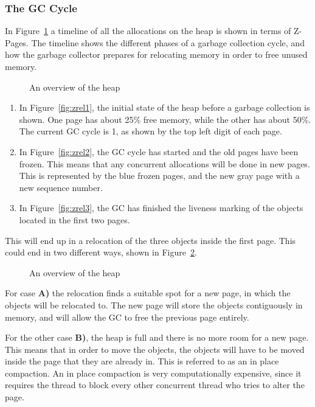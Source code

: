 \begin{figure*}
    \centering
    
    \caption[]
    {An example of a Z-Page and the overhead data that is used by ZGC.} 
    \label{fig:zpages}
\end{figure*}

\subsubsection{The GC Cycle}
In Figure~\ref{fig:zgc_timeline} a timeline of all the allocations on the heap is shown in terms of Z-Pages. The timeline shows the different phases of a garbage collection cycle, and how the garbage collector prepares for relocating memory in order to free unused memory.

\begin{figure}[!h]
    \centering
    
    \caption{An overview of the heap}
    \label{fig:zgc_timeline}
\end{figure}

\begin{enumerate}
    \item In Figure~\ref*{fig:zrel1}, the initial state of the heap before a garbage collection is shown. One page has about 25\% free memory, while the other has about 50\%. The current GC cycle is 1, as shown by the top left digit of each page.
    \item In Figure~\ref*{fig:zrel2}, the GC cycle has started and the old pages have been frozen. This means that any concurrent allocations will be done in new pages. This is represented by the blue frozen pages, and the new gray page with a new sequence number.
    \item In Figure~\ref*{fig:zrel3}, the GC has finished the liveness marking of the objects located in the first two pages. 
\end{enumerate}

This will end up in a relocation of the three objects inside the first page. This could end in two different ways, shown in Figure~\ref{fig:zreloc}.

\begin{figure}[!h]
    \centering
    
    \caption{An overview of the heap}
    \label{fig:zreloc}
\end{figure}
For case \textbf{A)} the relocation finds a suitable spot for a new page, in which the objects will be relocated to. The new page will store the objects contiguously in memory, and will allow the GC to free the previous page entirely.

For the other case \textbf{B)}, the heap is full and there is no more room for a new page. This means that in order to move the objects, the objects will have to be moved inside the page that they are already in. This is referred to as an in place compaction. An in place compaction is very computationally expensive, since it requires the thread to block every other concurrent thread who tries to alter the page. 
